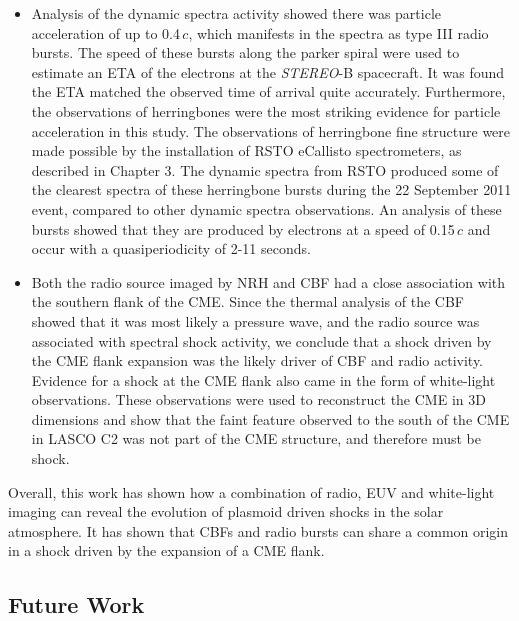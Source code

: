 \begin{itemize}
\item Analysis of the dynamic spectra activity showed there was particle acceleration of up to 0.4\,$c$, which manifests in the spectra as type III radio bursts. The speed of these bursts along the parker spiral were used to estimate an ETA of the electrons at the \emph{STEREO}-B spacecraft. It was found the ETA matched the observed time of arrival quite accurately. Furthermore, the observations of herringbones were the most striking evidence for particle acceleration in this study. The observations of herringbone fine structure were made possible by the installation of RSTO eCallisto spectrometers, as described in Chapter 3. The dynamic spectra from RSTO produced some of the clearest spectra of these herringbone bursts during the 22 September 2011 event, compared to other dynamic spectra observations. An analysis of these bursts showed that they are produced by electrons at a speed of 0.15\,$c$ and occur with a quasiperiodicity of 2-11 seconds.
\item Both the radio source imaged by NRH and CBF had a close association with the southern flank of the CME. Since the thermal analysis of the CBF showed that it was most likely a pressure wave, and the radio source was associated with spectral shock activity, we conclude that a shock driven by the CME flank expansion was the likely driver of CBF and radio activity. Evidence for a shock at the CME flank also came in the form of white-light observations. These observations were used to reconstruct the CME in 3D dimensions and show that the faint feature observed to the south of the CME in LASCO C2 was not part of the CME structure, and therefore must be shock.
\end{itemize}
Overall, this work has shown how a combination of radio, EUV and white-light imaging can reveal the evolution of plasmoid driven shocks in the solar atmosphere. It has shown that CBFs and radio bursts can share a common origin in a shock driven by the expansion of a CME flank.

\subsection{Future Work}

